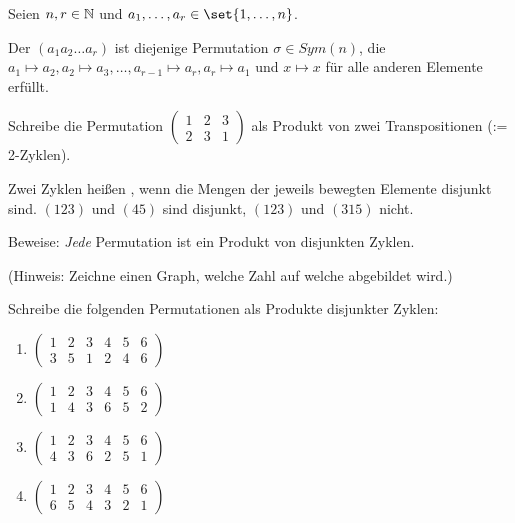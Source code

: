 \begin{sheet}
\begin{problem}[title={Zyklenzerlegung}]
Seien $n,r\in\mathbb{N}$ und $a_1,\ldots,a_r\in\set{1,\ldots,n}$.

Der  $(a_1 a_2 \ldots a_r)$ ist diejenige Permutation $\sigma\in Sym(n)$, die $a_1\mapsto a_2, a_2\mapsto a_3, \ldots, a_{r-1}\mapsto a_r, a_r\mapsto a_1$ und $x\mapsto x$ für alle anderen Elemente erfüllt.

\begin{subproblem}[difficulty={leicht}]
Schreibe die Permutation $\begin{pmatrix} 1 & 2 & 3 \\ 2 & 3 & 1 \end{pmatrix}$ als Produkt von zwei Transpositionen (:= 2-Zyklen).
\end{subproblem}

Zwei Zyklen heißen , wenn die Mengen der jeweils bewegten Elemente disjunkt sind. $(123)$ und $(45)$ sind disjunkt, $(123)$ und $(315)$ nicht.
\begin{subproblem}[difficulty={leicht bis mittel}]
Beweise: \emph{Jede} Permutation ist ein Produkt von disjunkten Zyklen.

(Hinweis: Zeichne einen Graph, welche Zahl auf welche abgebildet wird.)
\end{subproblem}

\begin{subproblem}[difficulty={leicht}]
Schreibe die folgenden Permutationen als Produkte disjunkter Zyklen:
\begin{enumerate}[label=(\roman*)]
\item $\begin{pmatrix} 1 & 2 & 3 & 4 & 5 & 6 \\ 3 & 5 & 1 & 2 & 4 & 6\end{pmatrix}$
\item $\begin{pmatrix} 1 & 2 & 3 & 4 & 5 & 6 \\ 1 & 4 & 3 & 6 & 5 & 2\end{pmatrix}$
\item $\begin{pmatrix} 1 & 2 & 3 & 4 & 5 & 6 \\ 4 & 3 & 6 & 2 & 5 & 1\end{pmatrix}$
\item $\begin{pmatrix} 1 & 2 & 3 & 4 & 5 & 6 \\ 6 & 5 & 4 & 3 & 2 & 1\end{pmatrix}$
\end{enumerate}
\end{subproblem}


\end{problem}
\end{sheet}
